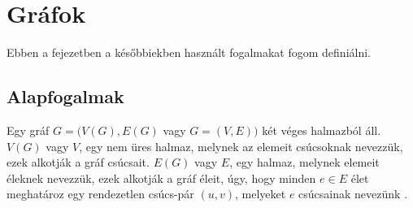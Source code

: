 \chapter{Gráfok}\label{ch:ALAP}

\begin{osszefoglal}
	Ebben a fejezetben a későbbiekben használt fogalmakat fogom definiálni.
	
\end{osszefoglal}

\section{Alapfogalmak}\label{sec:ALAP:adatelem}

Egy gráf \(G = (V(G),E(G)\) vagy \(G = (V,E))\) két véges halmazból áll. \(V(G)\) vagy \(V\), egy nem üres halmaz, melynek az elemeit csúcsoknak nevezzük, ezek alkotják a gráf csúcsait. \(E(G)\) vagy \(E\), egy halmaz, melynek elemeit éleknek nevezzük, ezek alkotják a gráf éleit, úgy, hogy minden \(e \in E\) élet meghatároz egy rendezetlen csúcs-pár \((u,v)\), melyeket \(e\) csúcsainak nevezünk \cite{16}.

